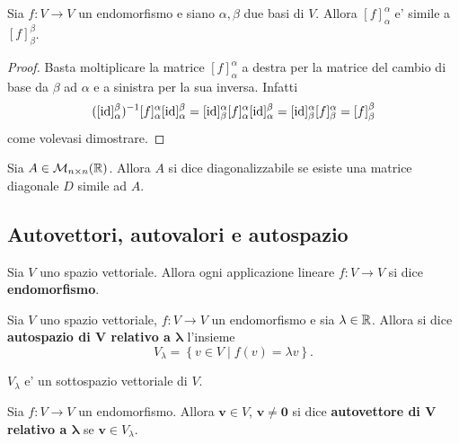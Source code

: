 \begin{proposition}
    Sia $f : V \to V$ un endomorfismo e siano $\alpha, \beta$ due basi di $V$. Allora $[f]_{\alpha}^{\alpha}$ e' simile a $[f]_{\beta}^{\beta}$.
\end{proposition}
\begin{proof}
    Basta moltiplicare la matrice $[f]_{\alpha}^{\alpha}$ a destra per la matrice del cambio di base da $\beta$ ad $\alpha$ e a sinistra per la sua inversa. Infatti \[
        ([\operatorname{id}]^{\beta}_{\alpha})^{-1}[f]_{\alpha}^{\alpha}[\operatorname{id}]^{\beta}_{\alpha} = [\operatorname{id}]^{\alpha}_{\beta}[f]_{\alpha}^{\alpha}[\operatorname{id}]^{\beta}_{\alpha} = [\operatorname{id}]^{\alpha}_{\beta}[f]_{\beta}^{\alpha} = [f]_{\beta}^{\beta}
    \] come volevasi dimostrare.
\end{proof}

\begin{definition}
    Sia $A \in \mathcal{M}_{n \times n}(\mathbb{R})$. Allora $A$ si dice diagonalizzabile se esiste una matrice diagonale $D$ simile ad $A$.
\end{definition}

\subsection{Autovettori, autovalori e autospazio}

\begin{definition}
    Sia $V$ uno spazio vettoriale. Allora ogni applicazione lineare $f : V \to V$ si dice \textbf{endomorfismo}.
\end{definition}

\begin{definition}
    Sia $V$ uno spazio vettoriale, $f : V \to V$ un endomorfismo e sia $\lambda \in \mathbb{R}$. Allora si dice \textbf{autospazio di $\bm{V}$ relativo a $\bm{\lambda}$} l'insieme \begin{equation}
        V_{\lambda} = \left\{ v \in V \mid f(v) = \lambda v \right\}.
    \end{equation}
\end{definition}

\begin{proposition}
    $V_{\lambda}$ e' un sottospazio vettoriale di $V$.
\end{proposition}

\begin{definition}
    Sia $f : V \to V$ un endomorfismo. Allora $\bm{v} \in V$, $\bm{v} \neq \bm{0}$ si dice \textbf{autovettore di $\bm{V}$ relativo a $\bm{\lambda}$} se $\bm{v} \in V_{\lambda}$.
\end{definition}

